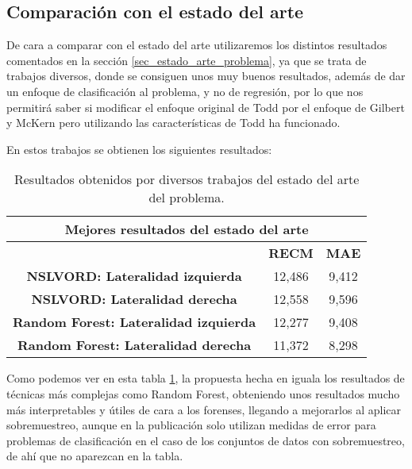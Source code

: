 \subsection{Comparación con el estado del arte}

De cara a comparar con el estado del arte utilizaremos los distintos resultados comentados en la sección \ref{sec_estado_arte_problema}, ya que se trata de trabajos diversos, donde se consiguen unos muy buenos resultados, además de dar un enfoque de clasificación al problema, y no de regresión, por lo que nos permitirá saber si modificar el enfoque original de Todd por el enfoque de Gilbert y McKern pero utilizando las características de Todd ha funcionado.

En estos trabajos se obtienen los siguientes resultados:

\begin{table}[H]
\centering
\begin{tabular}{|c|c|c|}
\hline
\multicolumn{3}{|c|}{\textbf{Mejores resultados del estado del arte}}        \\ \hline
\textbf{}                                     & \textbf{RECM} & \textbf{MAE} \\ \hline
\textbf{NSLVORD: Lateralidad izquierda}       & 12,486        & 9,412        \\ \hline
\textbf{NSLVORD: Lateralidad derecha}         & 12,558        & 9,596        \\ \hline
\textbf{Random Forest: Lateralidad izquierda} & 12,277        & 9,408        \\ \hline
\textbf{Random Forest: Lateralidad derecha}   & 11,372        & 8,298        \\ \hline
\end{tabular}%
\caption{Resultados obtenidos por diversos trabajos del estado del arte del problema.}\label{table:resultados_estado_arte}
\end{table}

Como podemos ver en esta tabla \ref{table:resultados_estado_arte}, la propuesta hecha en \cite{NSLVOrdAge} iguala los resultados de técnicas más complejas como Random Forest, obteniendo unos resultados mucho más interpretables y útiles de cara a los forenses, llegando a mejorarlos al aplicar sobremuestreo, aunque en la publicación solo utilizan medidas de error para problemas de clasificación en el caso de los conjuntos de datos con sobremuestreo, de ahí que no aparezcan en la tabla.

